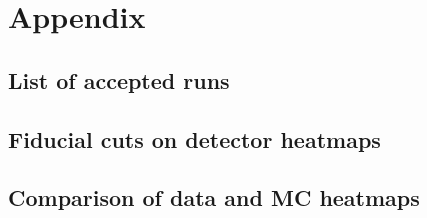 \newpage

\section*{Appendix}

\setcounter{subsection}{0}

\renewcommand\thesubsection{\Alph{subsection}}

\subsection{List of accepted runs}
\label{appendix:accepted_runs}
\noindent
\flushleft

\newpage

\subsection{Fiducial cuts on detector heatmaps}
\label{appendix:deadmaps}
%

\subsection{Comparison of data and MC heatmaps}
\label{appendix:deadmaps_comparison}
%

\newpage
